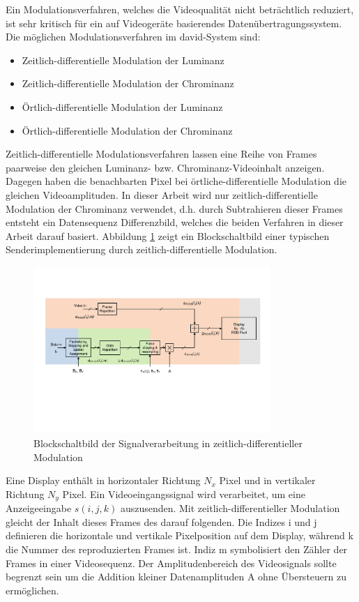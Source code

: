 Ein Modulationsverfahren, welches die Videoqualität nicht beträchtlich reduziert, ist sehr kritisch für ein auf Videogeräte basierendes Datenübertragungssystem. Die möglichen Modulationsverfahren im \gls{david}-System sind:
\begin{itemize}
	\item Zeitlich-differentielle Modulation der Luminanz
	\item Zeitlich-differentielle Modulation der Chrominanz
	\item Örtlich-differentielle Modulation der Luminanz
	\item Örtlich-differentielle Modulation der Chrominanz
\end{itemize}

Zeitlich-differentielle Modulationsverfahren lassen eine Reihe von Frames paarweise den gleichen Luminanz- bzw. Chrominanz-Videoinhalt anzeigen. Dagegen haben die benachbarten Pixel bei örtliche-differentielle Modulation die gleichen Videoamplituden. In dieser Arbeit wird nur zeitlich-differentielle Modulation der Chrominanz verwendet, d.h. durch Subtrahieren dieser Frames entsteht ein Datensequenz Differenzbild, welches die beiden Verfahren in dieser Arbeit darauf basiert. Abbildung \ref{fig:David3} zeigt ein Blockschaltbild einer typischen Senderimplementierung durch zeitlich-differentielle Modulation.

\begin{figure}[htb]
	\centering 
	\includegraphics[keepaspectratio,width=0.8\textwidth]{images/2_DaViD/2.pdf}
	\caption{Blockschaltbild der Signalverarbeitung in zeitlich-differentieller Modulation}
	\label{fig:David3}
\end{figure}

Eine Display enthält in horizontaler Richtung $N_x$ Pixel und in vertikaler Richtung $N_y$ Pixel. Ein Videoeingangssignal wird verarbeitet, um eine Anzeigeeingabe $s(i,j,k)$ auszusenden. Mit zeitlich-differentieller Modulation gleicht der Inhalt dieses Frames des darauf folgenden. Die Indizes i und j definieren die horizontale und vertikale Pixelposition auf dem Display, während k die Nummer des reproduzierten Frames ist. Indiz m symbolisiert den Zähler der Frames in einer Videosequenz. Der Amplitudenbereich des Videosignals sollte begrenzt sein um die Addition kleiner Datenamplituden A ohne Übersteuern zu ermöglichen.

